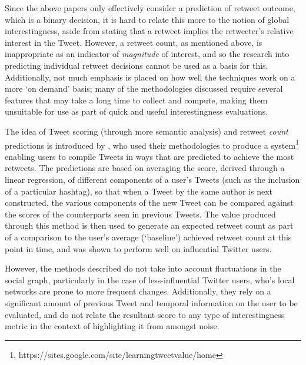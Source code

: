Since the above papers only effectively consider a prediction of retweet outcome, which is a binary decision, it is hard to relate this more to the notion of global interestingness, aside from stating that a retweet implies the retweeter's relative interest in the Tweet. However, a retweet count, as mentioned above, is inappropriate as an indicator of \textit{magnitude} of interest, and so the research into predicting individual retweet decisions cannot be used as a basis for this. Additionally, not much emphasis is placed on how well the techniques work on a more `on demand' basis; many of the methodologies discussed require several features that may take a long time to collect and compute, making them unsuitable for use as part of quick and useful interestingness evaluations.

The idea of Tweet scoring (through more semantic analysis) and retweet \textit{count} predictions is introduced by \citet{gransee12}, who used their methodologies to produce a system\footnote{https://sites.google.com/site/learningtweetvalue/home} enabling users to compile Tweets in ways that are predicted to achieve the most retweets. The predictions are based on averaging the score, derived through a linear regression, of different components of a user's Tweets (such as the inclusion of a particular hashtag), so that when a Tweet by the same author is next constructed, the various components of the new Tweet can be compared against the scores of the counterparts seen in previous Tweets. The value produced through this method is then used to generate an expected retweet count as part of a comparison to the user's average (`baseline') achieved retweet count at this point in time, and was shown to perform well on influential Twitter users.

However, the methods described do not take into account fluctuations in the social graph, particularly in the case of less-influential Twitter users, who's local networks are prone to more frequent changes. Additionally, they rely on a significant amount of previous Tweet and temporal information on the user to be evaluated, and do not relate the resultant score to any type of interestingness metric in the context of highlighting it from amongst noise.

